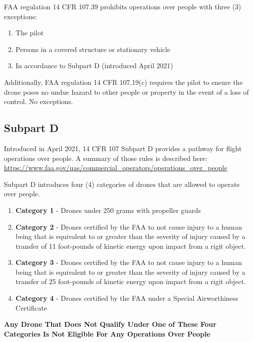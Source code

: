 \documentclass[
  12pt,
]{book}
\providecommand{\tightlist}{%
  \setlength{\itemsep}{0pt}\setlength{\parskip}{0pt}}
\begin{document}
FAA regulation 14 CFR 107.39 prohibits operations over people with three (3) exceptions:

\begin{enumerate}
\def\labelenumi{\arabic{enumi}.}
\tightlist
\item
  The pilot
\item
  Persons in a covered structure or stationary vehicle
\item
  In accordance to Subpart D (introduced April 2021)
\end{enumerate}

Additionally, FAA regulation 14 CFR 107.19(c) requires the pilot to ensure the drone poses no undue hazard to other people or property in the event of a loss of control. No exceptions.

\subsection{Subpart D}\label{subpart-d}

Introduced in April 2021, 14 CFR 107 Subpart D provides a pathway for flight operations over people. A summary of those rules is described here: \url{https://www.faa.gov/uas/commercial_operators/operations_over_people}

Subpart D introduces four (4) categories of drones that are allowed to operate over people.

\begin{enumerate}
\def\labelenumi{\arabic{enumi}.}
\tightlist
\item
  \textbf{Category 1} - Drones under 250 grams with propeller guards
\item
  \textbf{Category 2} - Drones certified by the FAA to not cause injury to a human being that is equivalent to or greater than the severity of injury caused by a transfer of 11 foot-pounds of kinetic energy upon impact from a rigit object.
\item
  \textbf{Category 3} - Drones certified by the FAA to not cause injury to a human being that is equivalent to or greater than the severity of injury caused by a transfer of 25 foot-pounds of kinetic energy upon impact from a rigit object.
\item
  \textbf{Category 4} - Drones certified by the FAA under a Special Airworthiness Certificate
\end{enumerate}

\textbf{Any Drone That Does Not Qualify Under One of These Four Categories Is Not Eligible For Any Operations Over People}
\end{document}
